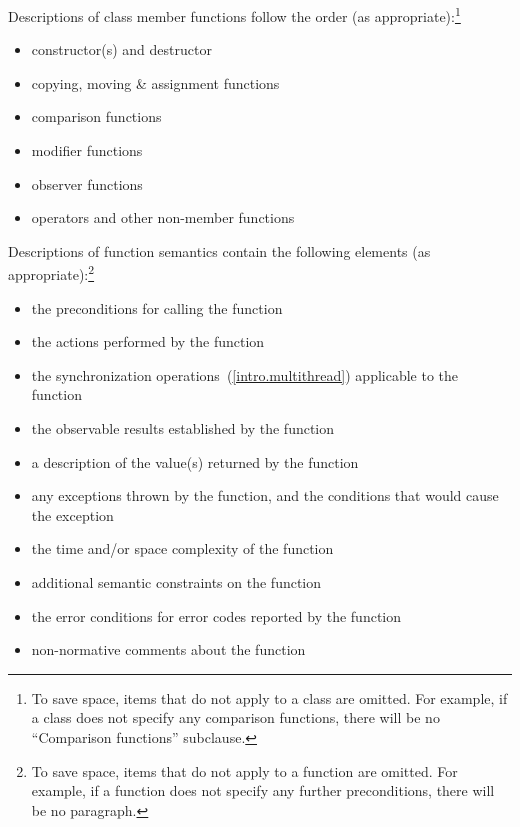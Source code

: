 \pnum
Descriptions of class member functions follow the order (as
appropriate):\footnote{To save space, items that do not apply to a class are omitted.
For example, if a class does not specify any comparison functions, there
will be no ``Comparison functions'' subclause.}

\begin{itemize}
\item constructor(s) and destructor
\item copying, moving \& assignment functions
\item comparison functions
\item modifier functions
\item observer functions
\item operators and other non-member functions
\end{itemize}

\pnum
Descriptions of function semantics contain the following elements (as
appropriate):\footnote{To save space, items that do not apply to a function are omitted.
For example, if a function does not specify any
further
preconditions, there will be no \requires paragraph.}

\begin{itemize}
\item \requires the preconditions for calling the function
\item \effects the actions performed by the function
\item \sync the synchronization operations~(\ref{intro.multithread}) applicable to the function
\item \postconditions the observable results established by the function
\item \returns a description of the value(s) returned by the function
\item \throws any exceptions thrown by the function, and the conditions that would cause the exception
\item \complexity the time and/or space complexity of the function
\item \remarks additional semantic constraints on the function
\item \errors the error conditions for error codes reported by the function
\item \realnotes non-normative comments about the function
\end{itemize}

